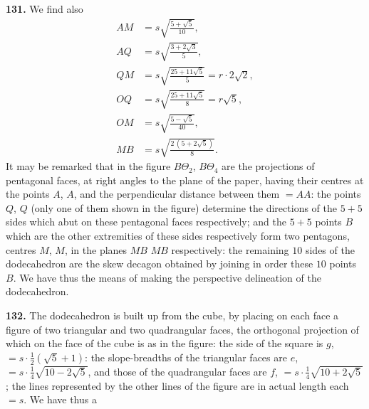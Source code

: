 \documentclass[11pt]{article}
\newcommand{\artno}[1]{\textbf{#1.}\quad}
\begin{document}
\bigskip
\noindent
\artno{131} We find also
\begin{align*}
  AM &= s\sqrt{\tfrac{5 + \sqrt{5}}{10}},\\
  AQ &= s\sqrt{\tfrac{3 + 2\sqrt{3}}{5}},\\
  QM &= s\sqrt{\tfrac{25 + 11\sqrt{5}}{5}} = r\cdot 2\sqrt{2},\\
  OQ &= s\sqrt{\tfrac{25 + 11\sqrt{5}}{8}} = r\sqrt{5},\\
  OM &= s\sqrt{\tfrac{5 - \sqrt{5}}{40}},\\
  MB &= s\sqrt{\tfrac{2\,(5 + 2\sqrt{5})}{8}}.
\end{align*}
It may be remarked that in the figure $B\Theta_{2}$, $B\Theta_{4}$ are the
projections of pentagonal faces, at right angles to the plane of the paper,
having their centres at the points $A$, $A$, and the perpendicular distance
between them $= AA$: the points $Q$, $Q$ (only one of them shown in the
figure) determine the directions of the $5 + 5$ sides which abut on these
pentagonal faces respectively; and the $5 + 5$ points $B$ which are the other
extremities of these sides respectively form two pentagons, centres $M$, $M$,
in the planes $MB$ $MB$ respectively: the remaining $10$ sides of the
dodecahedron are the skew decagon obtained by joining in order these $10$
points $B$. We have thus the means of making the perspective delineation of
the dodecahedron.

\medskip
\noindent
\artno{132} The dodecahedron is built up from the cube, by placing on each
face a figure of two triangular and two quadrangular faces, the orthogonal
projection of which on the face of the cube is as in the figure: the side of
the square is $g$, $= s \cdot \tfrac{1}{2}(\sqrt{5} + 1)$: the slope-breadths
of the triangular faces are $e$, $= s \cdot \tfrac{1}{4}\sqrt{10 - 2\sqrt{5}}$,
and those of the quadrangular faces are $f$,
$= s \cdot \tfrac{1}{4}\sqrt{10 + 2\sqrt{5}}$; the lines represented by the
other lines of the figure are in actual length each $= s$. We have thus a

\begin{center}
\end{center}
\end{document}
